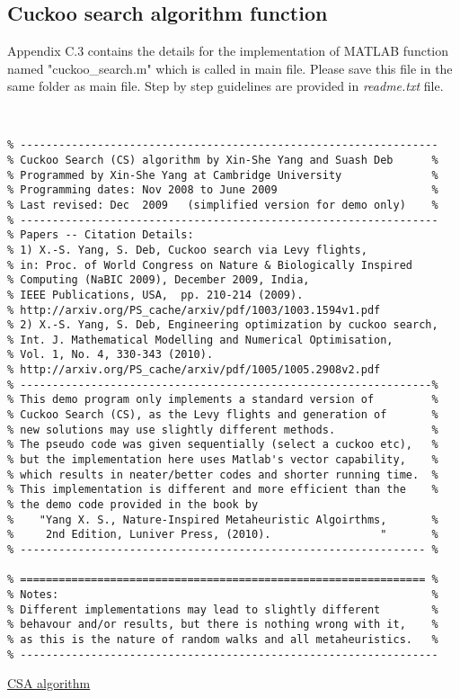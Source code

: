 \newpage
\subsection{Cuckoo search algorithm function}
Appendix C.3 contains the details for the implementation of MATLAB function named "cuckoo\_search.m" which is called in main file. Please save this file in the same folder as main file. Step by step guidelines are provided in \textit{readme.txt} file.\par

\begin{linenumbers}
\begin{lstlisting}


% -----------------------------------------------------------------
% Cuckoo Search (CS) algorithm by Xin-She Yang and Suash Deb      %
% Programmed by Xin-She Yang at Cambridge University              %
% Programming dates: Nov 2008 to June 2009                        %
% Last revised: Dec  2009   (simplified version for demo only)    %
% -----------------------------------------------------------------
% Papers -- Citation Details:
% 1) X.-S. Yang, S. Deb, Cuckoo search via Levy flights,
% in: Proc. of World Congress on Nature & Biologically Inspired
% Computing (NaBIC 2009), December 2009, India,
% IEEE Publications, USA,  pp. 210-214 (2009).
% http://arxiv.org/PS_cache/arxiv/pdf/1003/1003.1594v1.pdf
% 2) X.-S. Yang, S. Deb, Engineering optimization by cuckoo search,
% Int. J. Mathematical Modelling and Numerical Optimisation,
% Vol. 1, No. 4, 330-343 (2010).
% http://arxiv.org/PS_cache/arxiv/pdf/1005/1005.2908v2.pdf
% ----------------------------------------------------------------%
% This demo program only implements a standard version of         %
% Cuckoo Search (CS), as the Levy flights and generation of       %
% new solutions may use slightly different methods.               %
% The pseudo code was given sequentially (select a cuckoo etc),   %
% but the implementation here uses Matlab's vector capability,    %
% which results in neater/better codes and shorter running time.  %
% This implementation is different and more efficient than the    %
% the demo code provided in the book by
%    "Yang X. S., Nature-Inspired Metaheuristic Algoirthms,       %
%     2nd Edition, Luniver Press, (2010).                 "       %
% --------------------------------------------------------------- %

% =============================================================== %
% Notes:                                                          %
% Different implementations may lead to slightly different        %
% behavour and/or results, but there is nothing wrong with it,    %
% as this is the nature of random walks and all metaheuristics.   %
% -----------------------------------------------------------------
\end{lstlisting}
\hypertarget{CSA_code}{}
\hyperlink{CSA_text}{CSA algorithm}
\begin{lstlisting}


\end{lstlisting}
\end{linenumbers}
